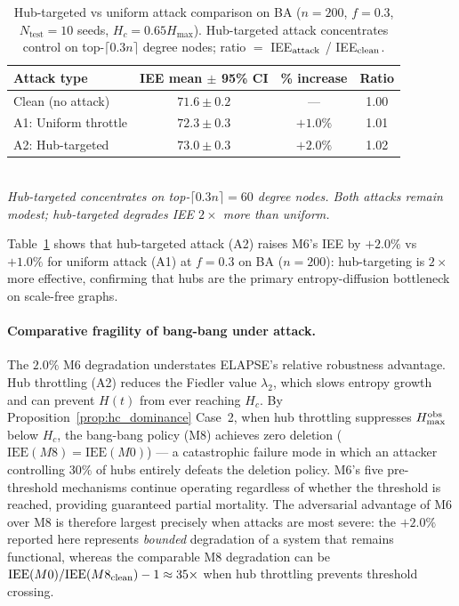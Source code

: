 \documentclass[review,12pt]{elsarticle}
\newcommand{\IEE}{\mathrm{IEE}}
\newcommand{\Hc}{H_c}
\newcommand{\Hmax}{H_{\max}}
\begin{document}
\begin{table}[htbp]
  \caption{Hub-targeted vs uniform attack comparison on BA ($n=200$, $f=0.3$,
           $N_{\mathrm{test}}=10$ seeds, $\Hc = 0.65\Hmax$).
           Hub-targeted attack concentrates control on top-$\lceil 0.3n\rceil$
           degree nodes; ratio $=$ IEE$_{\rm attack}$ / IEE$_{\rm clean}$.}
  \label{tab:hub_attack}
  \centering
  \small
  \renewcommand{\arraystretch}{1.15}
  \begin{tabular}{lccc}
    \toprule
    Attack type & IEE mean $\pm$ 95\% CI & \% increase & Ratio \\
    \midrule
    Clean (no attack)    & $71.6\pm 0.2$ & ---  & 1.00 \\
    A1: Uniform throttle & $72.3\pm 0.3$ & $+1.0\%$ & 1.01 \\
    A2: Hub-targeted     & $73.0\pm 0.3$ & $+2.0\%$ & 1.02 \\
    \bottomrule
  \end{tabular}
  \smallskip\\
  \small\textit{Hub-targeted concentrates on top-$\lceil 0.3n\rceil=60$ degree nodes.
  Both attacks remain modest; hub-targeted degrades IEE $2\times$ more than uniform.}
\end{table}

Table~\ref{tab:hub_attack} shows that hub-targeted attack (A2) raises M6's
IEE by $+2.0\%$ vs $+1.0\%$ for uniform attack (A1) at $f=0.3$ on BA ($n=200$):
hub-targeting is $2\times$ more effective, confirming that hubs are the
primary entropy-diffusion bottleneck on scale-free graphs.

\paragraph{Comparative fragility of bang-bang under attack.}
The $2.0\%$ M6 degradation understates ELAPSE's relative robustness advantage.
Hub throttling (A2) reduces the Fiedler value $\lambda_2$, which slows entropy
growth and can prevent $H(t)$ from ever reaching $\Hc$.  By
Proposition~\ref{prop:hc_dominance} Case~2, when hub throttling suppresses
$H_{\max}^{\rm obs}$ below $\Hc$, the bang-bang policy (M8) achieves zero
deletion ($\IEE(M8) = \IEE(M0)$) --- a catastrophic failure mode in which
an attacker controlling $30\%$ of hubs entirely defeats the deletion policy.
M6's five pre-threshold mechanisms continue operating regardless of whether
the threshold is reached, providing guaranteed partial mortality.
The adversarial advantage of M6 over M8 is therefore largest precisely
when attacks are most severe: the $+2.0\%$ reported here represents
\emph{bounded} degradation of a system that remains functional, whereas
the comparable M8 degradation can be $\IEE(M0)/\IEE(M8_{\rm clean}) - 1
\approx 35\times$ when hub throttling prevents threshold crossing.
\end{document}
